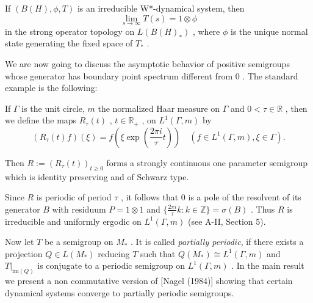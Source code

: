 \begin{corollary}\label{cor:d4-3.9}
If $ (B(H),\phi,T) $  is an irreducible W*-dynamical system, then
\[
\lim_{s \to \infty} T(s) = 1 \otimes \phi
\]
in the strong operator topology on $ L(B(H)_{*}) $ , where $ \phi $  is the unique normal state generating the fixed space of $ T_{*} $ .
\end{corollary}

We are now going to discuss the asymptotic behavior of positive semigroups whose generator has boundary point spectrum different from $ 0 $ .
The standard example is the following:

If $ \Gamma $  is the unit circle, $ m $  the normalized Haar measure on $ \Gamma $  and $ 0 < \tau \in \mathbb{R} $ , then we define the maps $ R_{\tau}(t) $ , $ t \in \mathbb{R}_{+} $ , on $ L^{1}(\Gamma,m) $  by
\[
(R_{\tau}(t)f)(\xi) = f(\xi\exp(\frac{2\pi i}{\tau}t)) \quad (f \in L^{1}(\Gamma,m), \xi \in \Gamma).
\]

Then $ R := (R_{\tau}(t))_{t \geq 0} $  forms a strongly continuous one parameter semigroup which is identity preserving and of Schwarz type.


\newpage

Since $ R $  is periodic of period $ \tau $ , it follows that 0 is a pole of the resolvent of its generator $ B $  with residuum $ P = 1 \otimes 1 $  and $ \{\frac{2\pi i}{\tau}k: k \in \mathbb{Z}\} = \sigma(B) $ .
Thus $ R $  is irreducible and uniformly ergodic on $ L^{1}(\Gamma,m) $  (see A-II, Section 5).

Now let $ T $  be a semigroup on $ M_{*} $ .
It is called \textit{partially periodic}, if there exists a projection $ Q \in L(M_{*}) $  reducing $ T $  such that $ Q(M_{*}) \cong L^{1}(\Gamma,m) $  and $ T|_{\text{im}(Q)} $  is conjugate to a periodic semigroup on $ L^{1}(\Gamma,m) $ .
In the main result we present a non commutative version of [Nagel (1984)] showing that certain dynamical systems converge to partially periodic semigroups.

